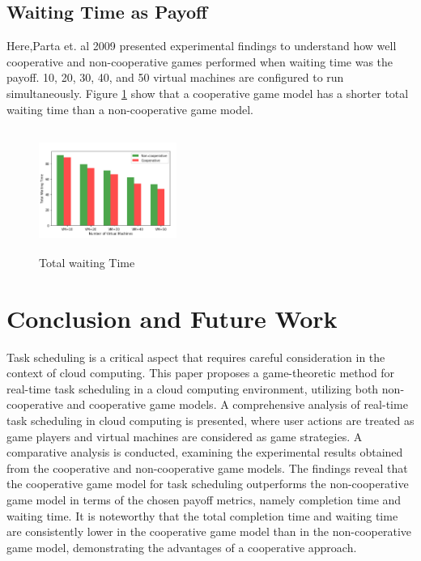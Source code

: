 \documentclass[conference]{IEEEtran}
\begin{document}
\subsection{Waiting Time as Payoff}
Here,Parta et. al 2009 presented \cite{patra2019game} experimental findings to understand how well cooperative and non-cooperative games performed when waiting time was the payoff. 10, 20, 30, 40, and 50 virtual machines are configured to run simultaneously. Figure \ref{Fig 9} show that a cooperative game model has a shorter total waiting time than a non-cooperative game model.

\begin{figure}[h]
  \centering
  \includegraphics[width=0.4\textwidth, height=4cm]{Figures/Fig 8.png}
  \caption{Total waiting Time \cite{patra2019game}}
  \label{Fig 9}
\end{figure}

\bigskip
\section{\textbf{Conclusion and Future Work}}
Task scheduling is a critical aspect that requires careful consideration in the context of cloud computing. This paper proposes a game-theoretic method for real-time task scheduling in a cloud computing environment, utilizing both non-cooperative and cooperative game models. A comprehensive analysis of real-time task scheduling in cloud computing is presented, where user actions are treated as game players and virtual machines are considered as game strategies. A comparative analysis is conducted, examining the experimental results obtained from the cooperative and non-cooperative game models. The findings reveal that the cooperative game model for task scheduling outperforms the non-cooperative game model in terms of the chosen payoff metrics, namely completion time and waiting time. It is noteworthy that the total completion time and waiting time are consistently lower in the cooperative game model than in the non-cooperative game model, demonstrating the advantages of a cooperative approach.
\end{document}
